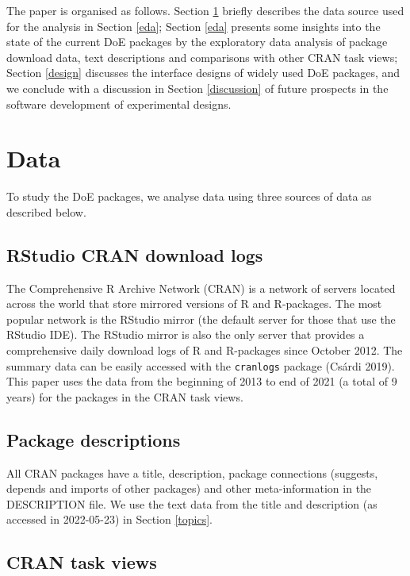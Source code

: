 \documentclass{article}
\begin{document}
The paper is organised as follows. Section \ref{data} briefly describes
the data source used for the analysis in Section \ref{eda}; Section
\ref{eda} presents some insights into the state of the current DoE
packages by the exploratory data analysis of package download data, text
descriptions and comparisons with other CRAN task views; Section
\ref{design} discusses the interface designs of widely used DoE
packages, and we conclude with a discussion in Section \ref{discussion}
of future prospects in the software development of experimental designs.

\hypertarget{data}{%
\section{Data}\label{data}}

To study the DoE packages, we analyse data using three sources of data
as described below.

\hypertarget{rstudio-cran-download-logs}{%
\subsection{RStudio CRAN download
logs}\label{rstudio-cran-download-logs}}

The Comprehensive R Archive Network (CRAN) is a network of servers
located across the world that store mirrored versions of R and
R-packages. The most popular network is the RStudio mirror (the default
server for those that use the RStudio IDE). The RStudio mirror is also
the only server that provides a comprehensive daily download logs of R
and R-packages since October 2012. The summary data can be easily
accessed with the \texttt{cranlogs} package (Csárdi 2019). This paper
uses the data from the beginning of 2013 to end of 2021 (a total of 9
years) for the packages in the CRAN task views.

\hypertarget{package-descriptions}{%
\subsection{Package descriptions}\label{package-descriptions}}

All CRAN packages have a title, description, package connections
(suggests, depends and imports of other packages) and other
meta-information in the DESCRIPTION file. We use the text data from the
title and description (as accessed in 2022-05-23) in Section
\ref{topics}.

\hypertarget{cran-task-views}{%
\subsection{CRAN task views}\label{cran-task-views}}
\end{document}
